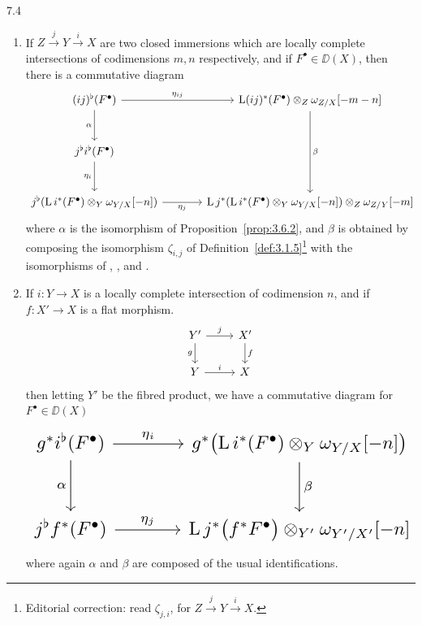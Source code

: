 \begin{bookproposition}{7.4}\label{prop:3.7.4}
\begin{enumerate}
\item[a)] If $Z\xrightarrow{j} Y\xrightarrow{i} X$ are two closed immersions which are locally complete intersections of codimensions $m,n$ respectively, and if $F^\bullet\in\DD(X)$, then there is a commutative diagram
\[
\resizebox{\linewidth}{!}{\begin{tikzcd}[ampersand replacement=\&, row sep=large, column sep=large]
	(ij)^\flat(F^\bullet) \arrow[r, "\eta_{ij}"] \arrow[d, "\alpha"']
	\& \LL (ij)^*(F^\bullet) \otimes_Z \omega_{Z/X}[-m-n] \arrow[dd, "\beta"] \\
	j^\flat i^\flat(F^\bullet) \arrow[d, "\eta_i"']
	\& \\
	j^\flat(\LL i^*(F^\bullet) \otimes_Y \omega_{Y/X}[-n]) \arrow[r, "\eta_j"']
	\& \LL j^*(\LL i^*(F^\bullet) \otimes_Y \omega_{Y/X}[-n]) \otimes_Z \omega_{Z/Y}[-m]
\end{tikzcd}}
\]
where $\alpha$ is the isomorphism of Proposition~\ref{prop:3.6.2}, and $\beta$ is
obtained by composing the isomorphism $\zeta_{i,j}$ of Definition~\ref{def:3.1.5}\footnote{Editorial correction: read $\zeta_{j,i}$, for $Z\xrightarrow{j}Y\xrightarrow{i}X$.}
with the isomorphisms of , , and .

\item[b)] If $i\colon Y\to X$ is a locally complete intersection of codimension $n$, and if $f\colon X'\to X$ is a flat morphism.
\[
\begin{tikzcd}
	Y' \arrow[r, "j"] \arrow[d, "g"'] & X' \arrow[d, "f"] \\
	Y \arrow[r, "i"] & X
\end{tikzcd}
\]
then letting $Y'$ be the fibred product, we have a commutative diagram for $F^\bullet\in\DD(X)$
\[
\resizebox{\linewidth}{!}{\begin{tikzcd}[ampersand replacement=\&, row sep=large, column sep=large]
g^*i^{\flat}(F^\bullet) \arrow[r, "\eta_i"] \arrow[d, "\alpha"'] \& g^*\bigl(\LL i^*(F^\bullet)\otimes_Y\omega_{Y/X}[-n]\bigr) \arrow[d, "\beta"] \\
j^{\flat}f^*(F^\bullet) \arrow[r, "\eta_j"] \& \LL j^*\bigl(f^*F^\bullet\bigr)\otimes_{Y'}\omega_{Y'/X'}[-n]
\end{tikzcd}}
\]
where again $\alpha$ and $\beta$ are composed of the usual identifications.
\end{enumerate}
\end{bookproposition}


